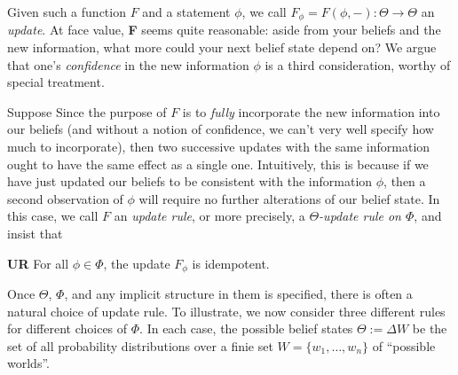 \documentclass{uai2023}
\theoremstyle{plain}
\theoremstyle{definition}
\begin{document}
Given such a function $F$ and a statement $\phi$, we call $F_\phi = F(\phi, -) : \Theta \to \Theta$ an \emph{update}.
At face value, \textbf{F} seems quite reasonable:
aside from your beliefs and the new information, what more could your next belief state depend on?
We argue that one's \emph{confidence} in the new information $\phi$ is a third consideration,
worthy of special treatment.


 

Suppose
Since the purpose of $F$ is to \emph{fully} incorporate the new information into our beliefs
(and without a notion of confidence, we can't very well specify how much to incorporate),
then
two successive updates with the same information ought to have the same effect as a single one.
Intuitively, this is because if we have just updated our beliefs to be consistent with the information $\phi$, then a second observation of $\phi$ will require no further alterations of our belief state.
In this case, we call $F$ an \emph{update rule}, or more precisely, a \emph{$\Theta$-update rule on $\Phi$}, and insist that
\begin{CFaxioms}
	\item[\textbf{UR}] For all $\phi \in \Phi$, the update $F_\phi$ is
idempotent.
\end{CFaxioms}



Once $\Theta$, $\Phi$, and any implicit structure in them is specified, there is often a natural choice of update rule.
To illustrate, we now consider three different rules for different choices of $\Phi$.
In each case, the possible belief states $\Theta := \Delta W$ be the set of all probability distributions over a finie set $W = \{w_1, \ldots, w_n\}$ of ``possible worlds''.
\end{document}
